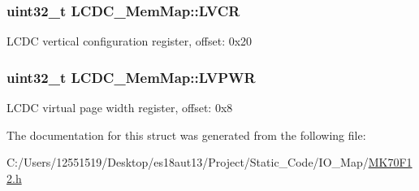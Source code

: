 \subsubsection[{L\+V\+C\+R}]{\setlength{\rightskip}{0pt plus 5cm}uint32\+\_\+t L\+C\+D\+C\+\_\+\+Mem\+Map\+::\+L\+V\+C\+R}\label{struct_l_c_d_c___mem_map_a865c74a990435ca94ba226f23894d8e7}
L\+C\+D\+C vertical configuration register, offset\+: 0x20 \hypertarget{struct_l_c_d_c___mem_map_aa687c8b47cdcef18890cac689de49a17}{}
\subsubsection[{L\+V\+P\+W\+R}]{\setlength{\rightskip}{0pt plus 5cm}uint32\+\_\+t L\+C\+D\+C\+\_\+\+Mem\+Map\+::\+L\+V\+P\+W\+R}\label{struct_l_c_d_c___mem_map_aa687c8b47cdcef18890cac689de49a17}
L\+C\+D\+C virtual page width register, offset\+: 0x8 

The documentation for this struct was generated from the following file\+:\begin{DoxyCompactItemize}
\item 
C\+:/\+Users/12551519/\+Desktop/es18aut13/\+Project/\+Static\+\_\+\+Code/\+I\+O\+\_\+\+Map/\hyperlink{_m_k70_f12_8h}{M\+K70\+F12.\+h}\end{DoxyCompactItemize}
